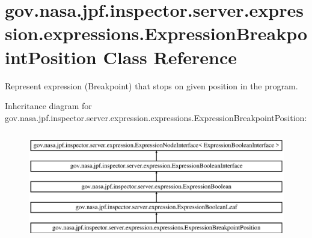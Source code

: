 \hypertarget{classgov_1_1nasa_1_1jpf_1_1inspector_1_1server_1_1expression_1_1expressions_1_1_expression_breakpoint_position}{}\section{gov.\+nasa.\+jpf.\+inspector.\+server.\+expression.\+expressions.\+Expression\+Breakpoint\+Position Class Reference}
\label{classgov_1_1nasa_1_1jpf_1_1inspector_1_1server_1_1expression_1_1expressions_1_1_expression_breakpoint_position}


Represent expression (Breakpoint) that stops on given position in the program.  


Inheritance diagram for gov.\+nasa.\+jpf.\+inspector.\+server.\+expression.\+expressions.\+Expression\+Breakpoint\+Position\+:\begin{figure}[H]
\begin{center}
\leavevmode
\includegraphics[height=4.827586cm]{classgov_1_1nasa_1_1jpf_1_1inspector_1_1server_1_1expression_1_1expressions_1_1_expression_breakpoint_position}
\end{center}
\end{figure}
